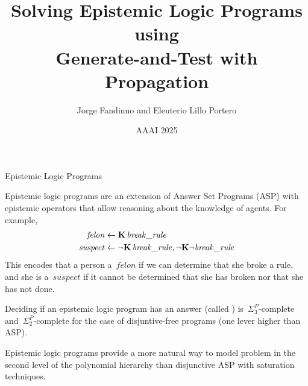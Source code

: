 \documentclass[aspectratio=169,svgnames,xcolor=table,t]{beamer}
\author[J. Fandinno \& Eleuterio Lillo Portero]{{\usebeamercolor[fg]{alerted text}Jorge Fandinno} and Eleuterio Lillo Portero}
\date{AAAI 2025}
\institute[UNO]{
    Department of Computer Science \\
    University of Nebraska Omaha
}
\title{Solving Epistemic Logic Programs using\\Generate-and-Test with Propagation}
\begin{document}
\frame{\titlepage}
\begin{frame}{Epistemic Logic Programs}
    \begin{myitemize}
        \item Epistemic logic programs are an extension of Answer Set Programs (ASP) with epistemic operators that allow reasoning about the knowledge of agents. For example,
        \begin{align*}
            \mathit{felon}   &\leftarrow \mathbf{K}\, \mathit{break\_rule}
            \\
            \mathit{suspect} &\leftarrow \neg \mathbf{K}\, \mathit{break\_rule}, \neg \mathbf{K} \neg \mathit{break\_rule}
        \end{align*}
        This encodes that a person a~$\mathit{felon}$ if we can determine that she broke a rule, and she is a~$\mathit{suspect}$ if it cannot be determined that she has broken nor that she has not done.
    
        \bigskip

        \item Deciding if an epistemic logic program has an answer (called ) is~$\Sigma^P_3$-complete and~$\Sigma^P_2$-complete for the case of disjuntive\nobreak-free programs (one lever higher than ASP).
        
        \bigskip

        \item Epistemic logic programs provide a more natural way to model problem in the second level of the polynomial hierarchy than disjunctive ASP with saturation techniques.
    \end{myitemize}
    \end{frame}
\end{document}
